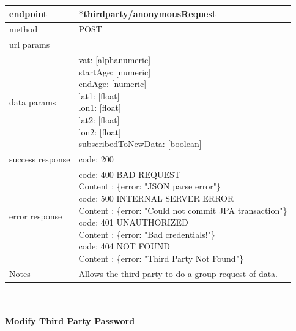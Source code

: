 \begin{legal}
\begin{legal}
\begin{itemize}
							\begin{tabularx}{\linewidth}{| l| l }
								\hline
								endpoint & *thirdparty/anonymousRequest \\
								\hline
								method & POST \\
								\hline
								url params & \\
								\hline
								data params &
								\parbox{0.7\textwidth}{
									\bigskip
									vat: [alphanumeric]\\
									startAge: [numeric]\\
									endAge: [numeric]\\
									lat1: [float]\\
									lon1: [float]\\
									lat2: [float]\\
									lon2: [float]\\
									subscribedToNewData: [boolean]
									\bigskip
								} \\
								\hline
								success response &
								\parbox{0.7\textwidth}{
									\bigskip
									code: 200
									\bigskip
								} \\
								\hline
								error response &
								\parbox{0.7\textwidth}{
									\bigskip
									code: 400 BAD REQUEST \\
									Content : \{error: "JSON parse error"\}\\
									code: 500 INTERNAL SERVER ERROR \\
									Content : \{error: "Could not commit JPA transaction"\}\\
									code: 401 UNAUTHORIZED \\
									Content : \{error: "Bad credentials!"\}\\
									code: 404 NOT FOUND \\
									Content : \{error: "Third Party Not Found"\}\\
									\bigskip
								} \\
								\hline
								Notes & 
								\parbox{0.7\textwidth}{
									\bigskip Allows the third party to do a group request of data.
								\bigskip}  \\
								\hline
							\end{tabularx}\\\\
					
							\textbf{Modify Third Party Password}\\
				

\end{itemize}
\end{legal}
\end{legal}
